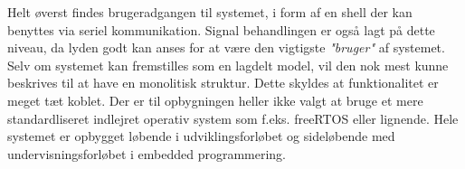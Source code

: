 Helt øverst findes brugeradgangen til systemet, i form af en shell der kan benyttes via seriel kommunikation.
Signal behandlingen er også lagt på dette niveau, da lyden godt kan anses for at være den vigtigste \textit{"bruger"} af systemet.\\

Selv om systemet kan fremstilles som en lagdelt model, vil den nok mest kunne beskrives til at have en monolitisk struktur.
Dette skyldes at funktionalitet er meget tæt koblet.
Der er til opbygningen heller ikke valgt at bruge et mere standardliseret indlejret operativ system som f.eks. freeRTOS eller lignende.
Hele systemet er opbygget løbende i udviklingsforløbet og sideløbende med undervisningsforløbet i embedded programmering.  


\FloatBlock